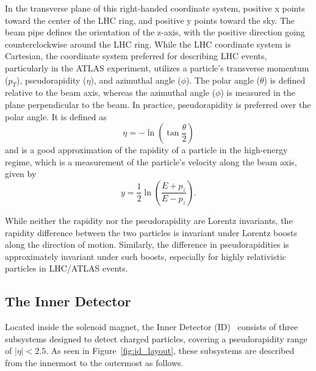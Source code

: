 In the transverse plane of this right-handed coordinate system, positive x points toward the center of the LHC ring, and positive y points toward the sky.
The beam pipe defines the orientation of the z-axis, with the positive direction going counterclockwise around the LHC ring.
While the LHC coordinate system is Cartesian, the coordinate system preferred for describing LHC events, particularly in the ATLAS experiment, utilizes a particle's transverse momentum ($p_T$), pseudorapidity ($\eta$), and azimuthal angle ($\phi$). The polar angle ($\theta$) is defined relative to the beam axis, whereas the azimuthal angle ($\phi$) is measured in the plane perpendicular to the beam.
In practice, pseudorapidity is preferred over the polar angle. It is defined as
\begin{equation}
    \eta = -\ln \left( \tan \frac{\theta}{2} \right)
\end{equation}
and is a good approximation of the rapidity of a particle in the high-energy regime, which is a measurement of the particle's velocity along the beam axis, given by
\begin{equation}
    y = \frac{1}{2} \ln \left( \frac{E + p_z}{E - p_z} \right).
\end{equation}

While neither the rapidity nor the pseudorapidity are Lorentz invariants, the rapidity difference between the two particles is invariant under Lorentz boosts along the direction of motion. Similarly, the difference in pseudorapidities is approximately invariant under such boosts, especially for highly relativistic particles in LHC/ATLAS events.

\subsection{The Inner Detector}
Located inside the solenoid magnet, the Inner Detector (ID)~\cite{ATLAS:1998yql} consists of three subsystems designed to detect charged particles, covering a pseudorapidity range of \(|\eta| < 2.5\). As seen in Figure~\ref{fig:id_layout}, these subsystems are described from the innermost to the outermost as follows.

